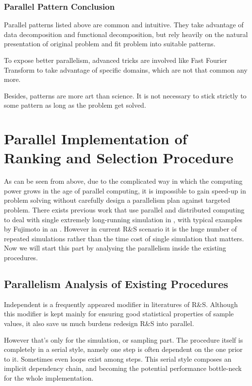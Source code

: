 \documentclass[12pt,a4paper]{report}
\begin{document}
\subsection{Parallel Pattern Conclusion}

Parallel patterns listed above are common and intuitive. They take advantage of data decomposition and functional decomposition, but rely heavily on the natural presentation of original problem and fit problem into suitable patterns.

To expose better parallelism, advanced tricks are involved like Fast Fourier Transform to take advantage of specific domains, which are not that common any more.

Besides, patterns are more art than science. It is not necessary to stick strictly to some pattern as long as the problem get solved.

\chapter{Parallel Implementation of Ranking and Selection Procedure}

As can be seen from above, due to the complicated way in which the computing power grows in the age of parallel computing, it is impossible to gain speed-up in problem solving without carefully design a parallelism plan against targeted problem. There exists previous work that use parallel and distributed computing to deal with single extremely long-running simulation in \cite{potwsc05ras}, with typical examples by Fujimoto in \cite{cotacm90fuji} an \cite{scsmasm10fuji}. However in current R\&S scenario it is the huge number of repeated simulations rather than the time cost of single simulation that matters. Now we will start this part by analysing the parallelism inside the existing procedures.

\section{Parallelism Analysis of Existing Procedures}

Independent is a frequently appeared modifier in literatures of R\&S. Although this modifier is kept mainly for ensuring good statistical properties of sample values, it also save us much burdens redesign R\&S into parallel.

However that's only for the simulation, or sampling part. The procedure itself is completely in a serial style, namely one step is often dependent on the one prior to it. Sometimes even loops exist among steps. This serial style composes an implicit dependency chain, and becoming the potential performance bottle-neck for the whole implementation.
\end{document}
